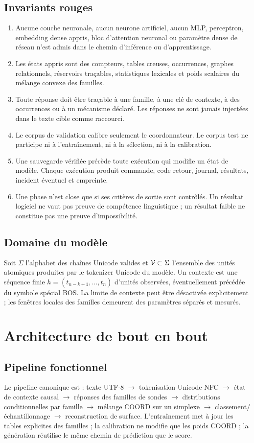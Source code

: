 \documentclass[11pt,a4paper,oneside,openany]{book}
\begin{document}
\section{Invariants rouges}
\begin{enumerate}
\item Aucune couche neuronale, aucun neurone artificiel, aucun MLP, perceptron, embedding dense appris, bloc d'attention neuronal ou paramètre dense de réseau n'est admis dans le chemin d'inférence ou d'apprentissage.
\item Les états appris sont des compteurs, tables creuses, occurrences, graphes relationnels, réservoirs traçables, statistiques lexicales et poids scalaires du mélange convexe des familles.
\item Toute réponse doit être traçable à une famille, à une clé de contexte, à des occurrences ou à un mécanisme déclaré. Les réponses ne sont jamais injectées dans le texte cible comme raccourci.
\item Le corpus de validation calibre seulement le coordonnateur. Le corpus test ne participe ni à l'entraînement, ni à la sélection, ni à la calibration.
\item Une sauvegarde vérifiée précède toute exécution qui modifie un état de modèle. Chaque exécution produit commande, code retour, journal, résultats, incident éventuel et empreinte.
\item Une phase n'est close que si ses critères de sortie sont contrôlés. Un résultat logiciel ne vaut pas preuve de compétence linguistique ; un résultat faible ne constitue pas une preuve d'impossibilité.
\end{enumerate}

\section{Domaine du modèle}
Soit $\Sigma$ l'alphabet des chaînes Unicode valides et $\mathcal V\subset\Sigma$ l'ensemble des unités atomiques produites par le tokenizer Unicode du modèle. Un contexte est une séquence finie $h=(t_{n-k+1},\ldots,t_n)$ d'unités observées, éventuellement précédée du symbole spécial BOS. La limite de contexte peut être désactivée explicitement ; les fenêtres locales des familles demeurent des paramètres séparés et mesurés.

\chapter{Architecture de bout en bout}
\section{Pipeline fonctionnel}
Le pipeline canonique est : texte UTF-8 $\to$ tokenisation Unicode NFC $\to$ état de contexte causal $\to$ réponses des familles de sondes $\to$ distributions conditionnelles par famille $\to$ mélange COORD sur un simplexe $\to$ classement/échantillonnage $\to$ reconstruction de surface. L'entraînement met à jour les tables explicites des familles ; la calibration ne modifie que les poids COORD ; la génération réutilise le même chemin de prédiction que le score.
\end{document}
